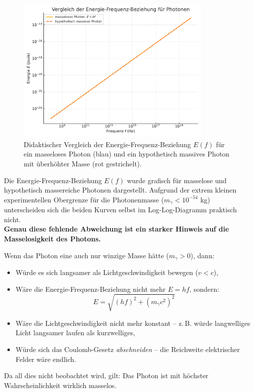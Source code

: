 \begin{figure}[H]
	\centering
	\includegraphics[width=0.85\textwidth]{bilder/photon_energie_vergleich_didaktisch.pdf}
	\caption{Didaktischer Vergleich der Energie-Frequenz-Beziehung \( E(f) \) für ein masseloses Photon (blau) und ein hypothetisch massives Photon mit überhöhter Masse (rot gestrichelt). }
	\label{fig:energie_f_masselos_massiv}
\end{figure}
\vspace{1em}
\begin{tcolorbox}[hinweisbox, title=Hinweis zur Grafik: Warum sieht man keinen Unterschied?]
	\label{box:Warum sieht man}
	Die Energie-Frequenz-Beziehung $E(f)$ wurde grafisch f\"ur masselose und hypothetisch massereiche Photonen dargestellt. Aufgrund der extrem kleinen experimentellen Obergrenze f\"ur die Photonenmasse ($m_\gamma < 10^{-54}$ kg) unterscheiden sich die beiden Kurven selbst im Log-Log-Diagramm praktisch nicht. \\[1ex]
	\textbf{Genau diese fehlende Abweichung ist ein starker Hinweis auf die Masselosigkeit des Photons.}
\end{tcolorbox}
\vspace{1em}
\begin{tcolorbox}[hypobox, title={Was wäre wenn, wenn das Photon eine Masse hätte? }]
	\label{box:was wäre wenn}
	Wenn das Photon eine auch nur winzige Masse hätte ($m_\gamma > 0$), dann:
	\begin{itemize}
		\item Würde es sich langsamer als Lichtgeschwindigkeit bewegen ($v < c$),
		\item Wäre die Energie-Frequenz-Beziehung nicht mehr $E = hf$, sondern:
		\begin{equation*}
			E = \sqrt{(hf)^2 + (m_\gamma c^2)^2}
		\end{equation*}
		\item Wäre die Lichtgeschwindigkeit nicht mehr konstant – z.\,B. würde langwelliges Licht langsamer laufen als kurzwelliges,
		\item Würde sich das Coulomb-Gesetz \textit{abschneiden} – die Reichweite elektrischer Felder wäre endlich.
	\end{itemize}
	Da all dies nicht beobachtet wird, gilt: Das Photon ist mit höchster Wahrscheinlichkeit wirklich masselos.
\end{tcolorbox}
\vspace{1em}
\newpage
\noindent
